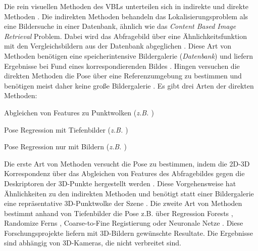 Die rein visuellen Methoden des VBLs unterteilen sich in indirekte und direkte Methoden \cite{lowryVisualPlaceRecognition2016}. Die indirekten Methoden behandeln das Lokalisierungsproblem als eine Bildersuche in einer Datenbank, ähnlich wie das \textit{Content Based Image Retrieval} \cite{lewContentbasedMultimediaInformation2006} Problem. Dabei wird das Abfragebild über eine Ähnlichkeitsfunktion mit den Vergleichsbildern aus der Datenbank abgeglichen \cite{zhangImageBasedLocalization2006, arandjelovicThreeThingsEveryone2012, radenovicCNNImageRetrieval2016}. Diese Art von Methoden benötigen eine speicherintensive Bildergalerie (\textit{Datenbank}) und liefern Ergebnisse bei Fund eines korrespondierenden Bildes \cite{lowryVisualPlaceRecognition2016}. Hingen versuchen die direkten Methoden die Pose über eine Referenzumgebung zu bestimmen und benötigen meist daher keine große Bildergalerie  \cite{piascoSurveyVisualBasedLocalization2018}. Es gibt drei Arten der direkten Methoden: 
\begin{enumerate*}[label=\arabic*)]
	\item Abgleichen von Features zu Punktwolken (\textit{z.B. \cite{liWorldwidePoseEstimation2012}})
	\item Pose Regression mit Tiefenbilder (\textit{z.B. \cite{shottonSceneCoordinateRegression2013a}})
	\item Pose Regression nur mit Bildern (\textit{z.B. \cite{kendallPoseNetConvolutionalNetwork2015}})
\end{enumerate*}

Die erste Art von Methoden versucht die Pose zu bestimmen, indem die 2D-3D Korrespondenz über das Abgleichen von Features des Abfragebildes gegen die Deskriptoren der 3D-Punkte hergestellt werden \cite{irscharaStructurefrommotionPointClouds2009, liWorldwidePoseEstimation2012, svarmCityScaleLocalizationCameras2017}. Diese Vorgehensweise hat Ähnlichkeiten zu den indirekten Methoden und benötigt statt einer Bildergalerie eine repräsentative 3D-Punktwolke der Szene \cite{piascoSurveyVisualBasedLocalization2018}. Die zweite Art von Methoden bestimmt anhand von Tiefenbilder die Pose z.B. über Regression Forests \cite{shottonSceneCoordinateRegression2013a}, Randomize Ferns \cite{glockerRealTimeRGBDCamera2015}, Coarse-to-Fine Registierung \cite{santosMappingIndoorSpaces2016} oder Neuronale Netze \cite{massicetiRandomForestsNeural2016}. Diese Forschungsprojekte liefern mit 3D-Bildern gewünschte Resultate. Die Ergebnisse sind abhängig von 3D-Kameras, die nicht verbreitet sind.

